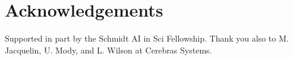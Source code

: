 \section*{Acknowledgements}
Supported in part by the Schmidt AI in Sci Fellowship.
Thank you also to M. Jacquelin, U. Mody, and L. Wilson at Cerebras Systems.
